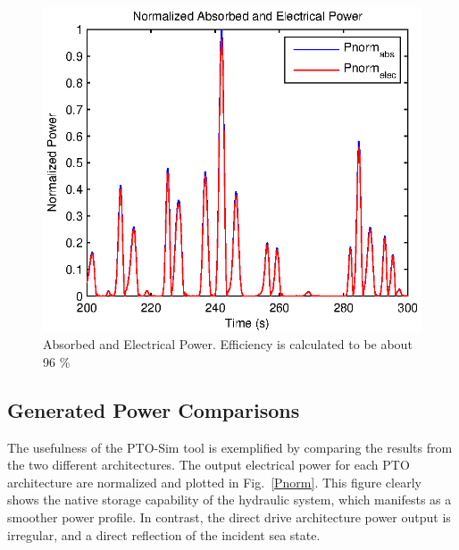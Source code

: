 \documentclass[twocolumn,10pt]{asme2e}
\begin{document}
\begin{figure}[t]
    \centering
    \includegraphics[width=1\columnwidth]{Images/normDDPabsPelec}
    \caption{Absorbed and Electrical Power. Efficiency is calculated to be about 96 \%}
    \label{DDP}
    \end{figure}
    
    
\subsection*{Generated Power Comparisons}

The usefulness of the PTO-Sim tool is exemplified by comparing the results from the two different architectures. The output electrical power for each PTO architecture are normalized and plotted in Fig.~\ref{Pnorm}. This figure clearly shows the native storage capability of the hydraulic system, which manifests as a smoother power profile. In contrast, the direct drive architecture power output is irregular, and a direct reflection of the incident sea state. 
\end{document}

